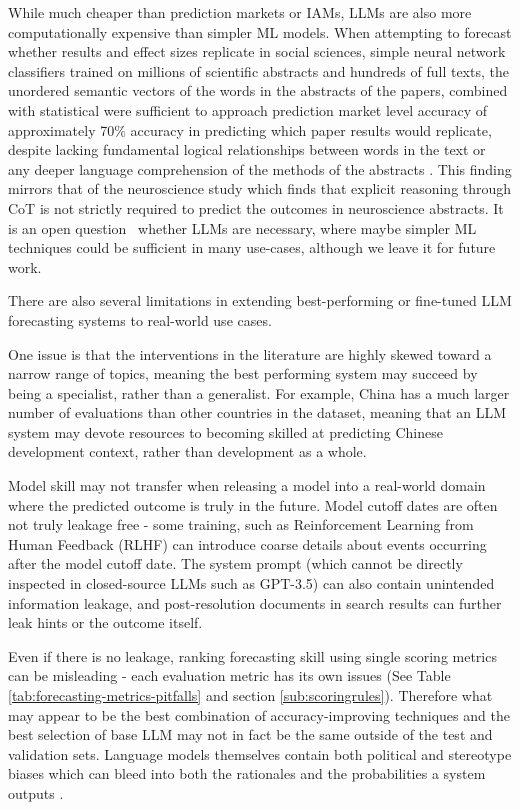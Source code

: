 \documentclass[12pt,a4paper]{article}
\begin{document}
While much cheaper than prediction markets or IAMs, LLMs are also more computationally expensive than simpler ML models. When attempting to forecast whether results and effect sizes replicate in social sciences, simple neural network classifiers trained on millions of scientific abstracts and hundreds of full texts, the unordered semantic vectors of the words in the abstracts of the papers, combined with statistical  were sufficient to approach prediction market level accuracy of approximately 70\% accuracy in predicting which paper results would replicate, despite lacking fundamental logical relationships between words in the text or any deeper language comprehension of the methods of the abstracts . This finding mirrors that of the neuroscience study  which finds that explicit reasoning through CoT is not strictly required to predict the outcomes in neuroscience abstracts. It is an open question \ABSTRACT\ whether LLMs are necessary, where maybe simpler ML techniques could be sufficient in many use-cases, although we leave it for future work.

There are also several limitations in extending best-performing or fine-tuned LLM forecasting systems to real-world use cases.

One issue is that the interventions in the literature are highly skewed toward a narrow range of topics, meaning the best performing system may succeed by being a specialist, rather than a generalist. For example, China has a much larger number of evaluations than other countries in the dataset, meaning that an LLM system may devote resources to becoming skilled at predicting Chinese development context, rather than development as a whole.

Model skill may not transfer when releasing a model into a real-world domain where the predicted outcome is truly in the future. Model cutoff dates are often not truly leakage free - some training, such as Reinforcement Learning from Human Feedback (RLHF) can introduce coarse details about events occurring after the model cutoff date. The system prompt (which cannot be directly inspected in closed-source LLMs such as GPT-3.5) can also contain unintended information leakage, and post-resolution documents in search results can further leak hints or the outcome itself.

Even if there is no leakage, ranking forecasting skill using single scoring metrics can be misleading - each evaluation metric has its own issues  (See Table \ref{tab:forecasting-metrics-pitfalls} and section \ref{sub:scoringrules}). Therefore what may appear to be the best combination of accuracy-improving techniques and the best selection of base LLM may not in fact be the same outside of the test and validation sets.  Language models themselves contain both political and stereotype biases which can bleed into both the rationales and the probabilities a system outputs  . 
\end{document}
